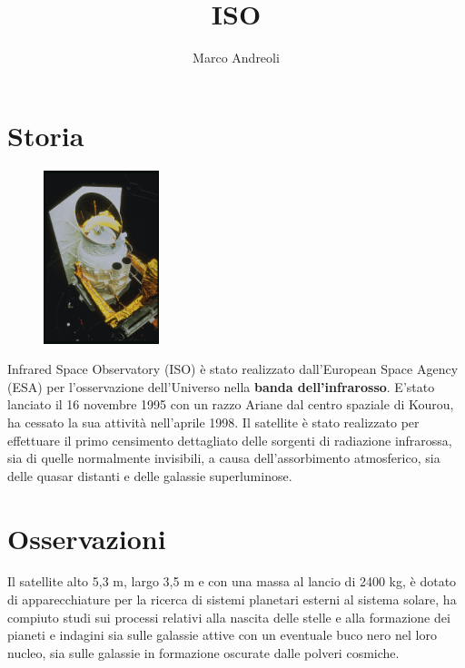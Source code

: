 \documentclass[12pt,a4paper]{article}
\begin{document}
\title{\vspace{-70pt}ISO}
\author{Marco Andreoli}
\date{}
\maketitle
\pagestyle{empty}
\thispagestyle{empty}

\section*{Storia}
\label{storia}
\begin{figure}
  \vspace{-10pt}
  \begin{center}
    \includegraphics[width=0.30\textwidth]{satellite}
  \end{center}
  \vspace{-20pt}
\end{figure}
Infrared Space Observatory (ISO) è stato realizzato dall'European Space Agency (ESA) per l'osservazione dell'Universo nella \textbf{banda dell'infrarosso}.
E’stato lanciato il 16 novembre 1995 con un razzo Ariane dal centro spaziale di Kourou, ha cessato la sua attività nell'aprile 1998.
Il satellite è stato realizzato per effettuare il primo censimento dettagliato delle sorgenti di radiazione infrarossa, sia di quelle normalmente invisibili, a causa dell'assorbimento atmosferico, sia delle quasar distanti e delle galassie superluminose. 

\section*{Osservazioni}
\label{osservazioni}

Il satellite alto 5,3 m, largo 3,5 m e con una massa al lancio di 2400 kg, è dotato di apparecchiature per la ricerca di sistemi planetari esterni al sistema solare, ha compiuto studi sui processi relativi alla nascita delle stelle e alla formazione dei pianeti e indagini sia sulle galassie attive con un eventuale buco nero nel loro nucleo, sia sulle galassie in formazione oscurate dalle polveri cosmiche. 
\end{document}
